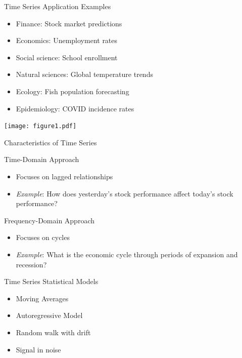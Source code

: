 \documentclass[ignorenonframetext,xcolor=x11names]{beamer}
\begin{document}
\begin{frame}{Time Series Application Examples}
\begin{itemize}
  \item Finance: Stock market predictions
  \item Economics: Unemployment rates
  \item Social science: School enrollment
  \item Natural sciences: Global temperature trends
  \item Ecology: Fish population forecasting
  \item Epidemiology: COVID incidence rates
\end{itemize}
\centering

\texttt{[image: figure1.pdf]}
\end{frame}


\begin{frame}{Characteristics of Time Series}
\begin{block}{Time-Domain Approach}
\begin{itemize}
  \item Focuses on lagged relationships
  \item \emph{Example}: How does yesterday's stock performance affect today's stock performance?
\end{itemize}
\end{block}

\begin{block}{Frequency-Domain Approach}
\begin{itemize}
  \item Focuses on cycles
  \item \emph{Example}: What is the economic cycle through periods of expansion and recession?
\end{itemize}
\end{block}
\end{frame}

\begin{frame}{Time Series Statistical Models}
\begin{itemize}
   \item Moving Averages
   \item Autoregressive Model
   \item Random walk with drift
   \item Signal in noise
\end{itemize}
\end{frame}
\end{document}
